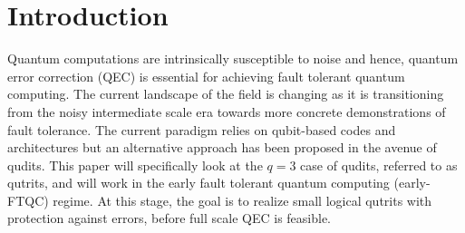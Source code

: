 \section{Introduction}\label{sec:intro}

Quantum computations are intrinsically susceptible to noise and hence, quantum error correction (QEC) is essential for achieving fault tolerant quantum computing. The current landscape of the field is changing as it is transitioning from the noisy intermediate scale era towards more concrete demonstrations of fault tolerance. The current paradigm relies on qubit-based codes and architectures but an alternative approach has been proposed in the avenue of qudits. This paper will specifically look at the $q=3$ case of qudits, referred to as qutrits, and will work in the early fault tolerant quantum computing (early-FTQC) regime. At this stage, the goal is to realize small logical qutrits with protection against errors, before full scale QEC is feasible. 

